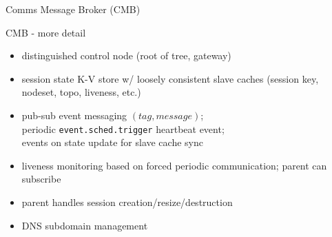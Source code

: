 \documentclass[default,pdf,colorBG,slideColor]{prosper}
\begin{document}
\begin{slide}{Comms Message Broker (CMB)}
{\begin{minipage}[b]{0.18\linewidth}
\end{minipage}
\hspace{0.5cm}
\begin{minipage}[b]{0.18\linewidth}
\end{minipage}
}\end{slide}
\begin{slide}{CMB - more detail}{\small
\begin{itemize}
  \item{distinguished control node (root of tree, gateway)}
  \item{session state K-V store w/ loosely consistent slave caches
	(session key, nodeset, topo, liveness, etc.)}
  \item{pub-sub event messaging $(tag, message)$;\\
	periodic {\tt event.sched.trigger} heartbeat event;\\
	events on state update for slave cache sync}
  \item{liveness monitoring based on forced periodic communication;
	parent can subscribe}
  \item{parent handles session creation/resize/destruction}
  \item{DNS subdomain management}
\end{itemize}
}\end{slide}
\end{document}
